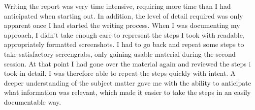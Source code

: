 \documentclass[../report.tex]{subfiles}
\begin{document}
Writing the report was very time intensive, requiring more time than I had anticipated when starting out.
In addition, the level of detail required was only apparent once I had started the writing process. When I was documenting my approach, I didn't take enough care to represent the steps I took with readable, appropriately formatted screenshots. I had to go back and repeat some steps to take satisfactory screengrabs, only gaining usable material during the second session. At that point I had gone over the material again and reviewed the steps i took in detail. I was therefore able to repeat the steps quickly with intent. A deeper understanding of the subject matter gave me with the ability to anticipate what information was relevant, which made it easier to take the steps in an easily documentable way.
\end{document}
